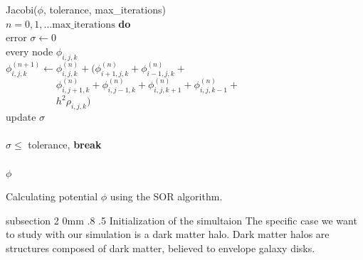 \documentclass[notitlepage, 12pt]{article}
\makeatletter
\renewcommand{\subsection}{\@startsection    %
        {subsection}
        {2}
        {0mm}
        {.8\baselineskip}
        {.5\baselineskip}
        {\bfseries\normalsize}}
\makeatother
\begin{document}
\begin{algorithm}[H]
\hspace{0.1\textwidth}\parbox{.8\textwidth}{
\-\hspace{0ex}{\bf function} Jacobi($\phi$, tolerance, max\_iterations)\\
\-\hspace{4ex}{\bf for} $n = 0,1,\ldots\mbox{max\_iterations}$ {\bf do}\\
\-\hspace{8ex}error $\sigma\leftarrow 0$\\
\-\hspace{8ex}{\bf for} every node $\phi_{i,j,k}$\\
\-\hspace{12ex}$\phi_{i,j,k}^{(n+1)} \leftarrow \phi_{i,j,k}^{(n)} + (\phi_{i+1,j,k}^{(n)} +\phi_{i-1,j,k}^{(n)}+$\\
\-\hspace{12ex}$\phantom{\phi_{i,j,k}^{(n+1)} \leftarrow }\phi_{i,j+1,k}^{(n)}+ \phi_{i,j-1,k}^{(n)} + \phi_{i,j,k+1}^{(n)} + \phi_{i,j,k-1}^{(n)} +$\\
\-\hspace{12ex}$\phantom{\phi_{i,j,k}^{(n+1)} \leftarrow} h^2\rho_{i,j,k})$\\
\-\hspace{12ex}update $\sigma$\\
\-\hspace{8ex}{\bf end for}\\
\-\hspace{8ex}{\bf if} $\sigma \leq $ tolerance, {\bf break}\\
\-\hspace{4ex}{\bf end for}\\
\-\hspace{4ex}{\bf return} $\phi$\\
\-\hspace{0ex}{\bf end function}}
\caption{Calculating potential $\phi$ using the SOR algorithm.}
\label{alg:Jacobi}
\end{algorithm}




\subsection{Initialization of the simultaion}
The specific case we want to study with our simulation is a dark matter halo. Dark matter halos are structures composed of dark matter, believed to envelope galaxy disks.
\end{document}
